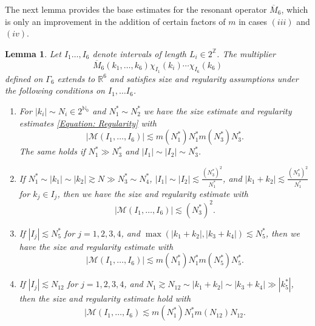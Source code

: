 \documentclass[12pt, letterpaper]{amsart}
\newtheorem{lemma}{Lemma}
\newcommand{\cal}[1]{\mathcal{#1}}
\begin{document}
The next lemma provides the base estimates for the resonant operator $\overline{M}_6$, which is only an improvement in the addition of certain factors of $m$ in cases $(iii)$ and $(iv)$.
\begin{lemma}\label{Lemma: M6 estimate}
    Let $I_1\dots, I_6$ denote intervals of length $L_i\in 2^\mathbb{Z}$. The multiplier 
    \[
    \overline{M}_6(k_1,\dots, k_6)\chi_{I_1}(k_i)\cdots\chi_{I_6}(k_6)
    \]
    defined on $\Gamma_6$ extends to $\mathbb{R}^6$ and satisfies size and regularity assumptions under the following conditions on $I_1,\dots I_6$.
    \begin{enumerate}[label = (\roman*)]
        \item For $|k_i|\sim N_i\in 2^{\mathbb{N}_0}$ and $N_1^*\sim N_2^*$ we have the size estimate and regularity estimates \eqref{Equation: Regularity} with 
        \begin{equation}\label{equation: M bound 1}
            |\cal{M}(I_1,\dots,I_6)|\lesssim m(N_1^*)N_1^*m(N_3^*)N_3^*.
        \end{equation}
        The same holds if $N_1^*\gg N_3^*$ and $|I_1|\sim |I_2|\sim N_3^*$.
        \item If $N_1^*\sim |k_1|\sim |k_2|\gtrsim N\gg N_3^*\sim N_4^*$, $|I_1|\sim |I_2|\lesssim \tfrac{(N_3^*)^2}{N_1^*}$, and $|k_1+k_2|\lesssim \tfrac{(N_3^*)^2}{N_1^*}$ for $k_j\in I_j$, then we have the size and regularity estimate with
        \begin{equation}\label{Equation: M bound 2}
            |\cal{M}(I_1,\dots, I_6)|\lesssim (N_3^*)^2.
        \end{equation}
        \item If $|I_j|\lesssim N_5^*$ for $j=1,2,3,4$, and $\max(|k_1+k_2|,|k_3+k_4|)\lesssim N_5^*$, then we have the size and regularity estimate with
        \begin{equation}\label{Equation: M bound 3}
            |\cal{M}(I_1,\dots, I_6)|\lesssim m(N_1^*)N_1^*m(N_5^*)N_5^*.
        \end{equation}
        \item If $|I_j|\lesssim N_{12}$ for $j = 1,2,3,4$, and $N_1\gtrsim N_{12}\sim |k_1+k_2|\sim |k_3+k_4|\gg |k_5^*|$, then the size and regularity estimate hold with
        \begin{equation}\label{Equation: M bound 4}
            |\cal{M}(I_1,\dots, I_6)\lesssim m(N_1^*)N_1^*m(N_{12})N_{12}.
        \end{equation}
    \end{enumerate}
\end{lemma}
\end{document}
